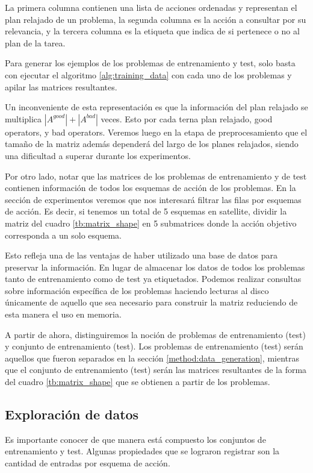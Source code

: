 La primera columna contienen una lista de acciones ordenadas y representan el
plan relajado de un problema, la segunda columna es la acción a consultar por su
relevancia, y la tercera columna es la etiqueta que indica de si pertenece o no
al plan de la tarea.

Para generar los ejemplos de los problemas de entrenamiento y test, solo basta
con ejecutar el algoritmo \ref{alg:training_data} con cada uno de los problemas
y apilar las matrices resultantes.

Un inconveniente de esta representación es que la información del plan relajado
se multiplica $|A^{good}| + |A^{bad}|$ veces. Esto por cada terna plan relajado,
good operators, y bad operators. Veremos luego en la etapa de preprocesamiento
que el tamaño de la matriz además dependerá del largo de los planes relajados,
siendo una dificultad a superar durante los experimentos.

Por otro lado, notar que las matrices de los problemas de entrenamiento y de
test contienen información de todos los esquemas de acción de los problemas. En
la sección de experimentos veremos que nos interesará filtrar las filas por
esquemas de acción. Es decir, si tenemos un total de 5 esquemas en satellite,
dividir la matriz del cuadro \ref{tb:matrix_shape} en 5 submatrices donde la
acción objetivo corresponda a un solo esquema.

Esto refleja una de las ventajas de haber utilizado una base de datos para
preservar la información. En lugar de almacenar los datos de todos los problemas
tanto de entrenamiento como de test ya etiquetados. Podemos realizar consultas
sobre información específica de los problemas haciendo lecturas al disco
únicamente de aquello que sea necesario para construir la matriz reduciendo de
esta manera el uso en memoria.

A partir de ahora, distinguiremos la noción de problemas de entrenamiento (test)
y conjunto de entrenamiento (test). Los problemas de entrenamiento (test) serán
aquellos que fueron separados en la sección \ref{method:data_generation},
mientras que el conjunto de entrenamiento (test) serán las matrices resultantes
de la forma del cuadro \ref{tb:matrix_shape} que se obtienen a partir de los
problemas.

\subsection{Exploración de datos}

Es importante conocer de que manera está compuesto los conjuntos de
entrenamiento y test. Algunas propiedades que se lograron registrar son la
cantidad de entradas por esquema de acción.

